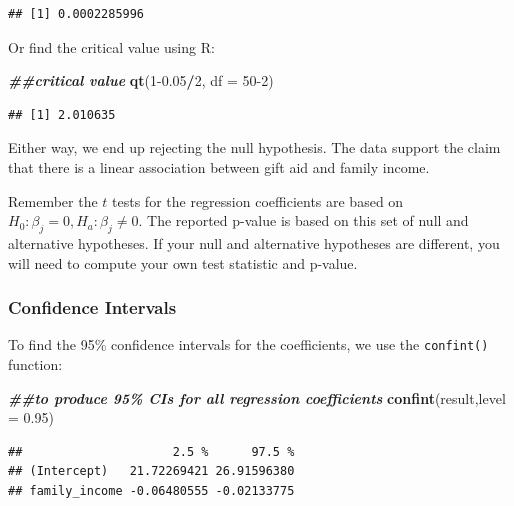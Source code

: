 \documentclass[
]{book}
\newenvironment{Shaded}{\begin{snugshade}}{\end{snugshade}}
\newcommand{\AttributeTok}[1]{\textcolor[rgb]{0.13,0.29,0.53}{#1}}
\newcommand{\DecValTok}[1]{\textcolor[rgb]{0.00,0.00,0.81}{#1}}
\newcommand{\DocumentationTok}[1]{\textcolor[rgb]{0.56,0.35,0.01}{\textbf{\textit{#1}}}}
\newcommand{\FloatTok}[1]{\textcolor[rgb]{0.00,0.00,0.81}{#1}}
\newcommand{\FunctionTok}[1]{\textcolor[rgb]{0.13,0.29,0.53}{\textbf{#1}}}
\newcommand{\NormalTok}[1]{#1}
\newcommand{\SpecialCharTok}[1]{\textcolor[rgb]{0.81,0.36,0.00}{\textbf{#1}}}
\begin{document}
\begin{verbatim}
## [1] 0.0002285996
\end{verbatim}

Or find the critical value using R:

\begin{Shaded}
\begin{Highlighting}[]
\DocumentationTok{\#\#critical value}
\FunctionTok{qt}\NormalTok{(}\DecValTok{1}\FloatTok{{-}0.05}\SpecialCharTok{/}\DecValTok{2}\NormalTok{, }\AttributeTok{df =} \DecValTok{50{-}2}\NormalTok{)}
\end{Highlighting}
\end{Shaded}

\begin{verbatim}
## [1] 2.010635
\end{verbatim}

Either way, we end up rejecting the null hypothesis. The data support the claim that there is a linear association between gift aid and family income.

Remember the \(t\) tests for the regression coefficients are based on \(H_0: \beta_j = 0, H_a: \beta_j \neq 0\). The reported p-value is based on this set of null and alternative hypotheses. If your null and alternative hypotheses are different, you will need to compute your own test statistic and p-value.

\hypertarget{confidence-intervals-1}{%
\subsubsection*{Confidence Intervals}\label{confidence-intervals-1}}

To find the 95\% confidence intervals for the coefficients, we use the \texttt{confint()} function:

\begin{Shaded}
\begin{Highlighting}[]
\DocumentationTok{\#\#to produce 95\% CIs for all regression coefficients}
\FunctionTok{confint}\NormalTok{(result,}\AttributeTok{level =} \FloatTok{0.95}\NormalTok{)}
\end{Highlighting}
\end{Shaded}

\begin{verbatim}
##                     2.5 %      97.5 %
## (Intercept)   21.72269421 26.91596380
## family_income -0.06480555 -0.02133775
\end{verbatim}
\end{document}
